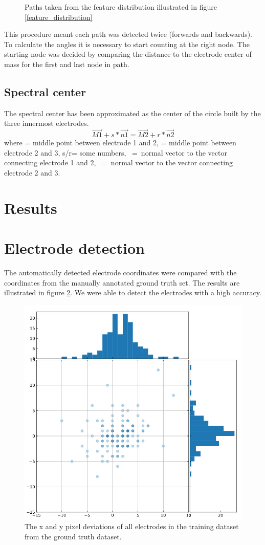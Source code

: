 \documentclass[a4paper, 10pt, twocolumn]{article}
\begin{document}
\begin{figure}[ht]
\begin{subfigure}[c]{0.32\textwidth}
\end{subfigure}
\caption{Paths taken from the feature distribution illustrated in figure \ref{feature_distribution}}
\label{graphs}
\end{figure}
This procedure meant each path was detected twice (forwards and backwards). To calculate the angles it is necessary to start counting at the right node. The starting node was decided by comparing the distance to the electrode center of mass for the first and last node in path.

\subsection{Spectral center}
The spectral center has been approximated as the center of the circle built by the three innermost electrodes.
$$\overrightarrow{M1}+s*\overrightarrow{n1}=\overrightarrow{M2}+r*\overrightarrow{n2}$$where  = middle point between electrode 1 and 2,  = middle point between electrode 2 and 3, s/r= some numbers, \ =\ normal vector to the vector connecting electrode 1 and 2, \ =\ normal vector to the vector connecting electrode 2 and 3.


\section{Results}

\section{Electrode detection}
The automatically detected electrode coordinates were compared with the coordinates from the manually annotated ground truth set. The results are illustrated in figure \ref{results_coord}. We were able to detect the electrodes with a high accuracy.

\begin{figure}[ht]
	\centering
  \includegraphics[width=.5\textwidth]{results_coord.jpeg}
	\caption{The x and y pixel deviations of all electrodes in the training dataset from the ground truth dataset.}
	\label{results_coord}
\end{figure}
\end{document}
